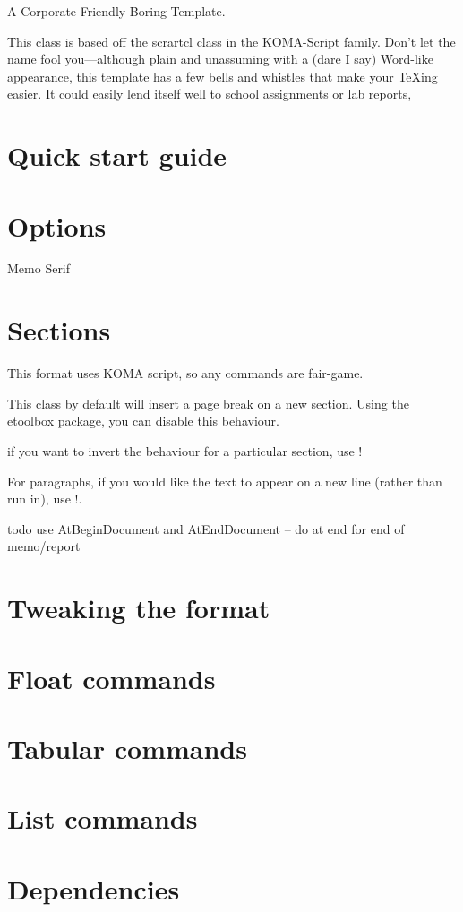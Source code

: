 \documentclass[memo]{corpboreport}
\begin{document}
A Corporate-Friendly Boring Template.

This class is based off the scrartcl class in the KOMA-Script family.
Don't let the name fool you---although plain and unassuming with a (dare I say) Word-like appearance,
this template has a few bells and whistles that make your TeXing easier.
It could easily lend itself well to school assignments or lab reports,

\section{Quick start guide}

\section{Options}
Memo
Serif

\section{Sections}

This format uses KOMA script, so any commands are fair-game.

This class by default will insert a page break on a new section.
Using the etoolbox package, you can disable this behaviour.

if you want to invert the behaviour for a particular section, use !

For paragraphs, if you would like the text to appear on a new line (rather than run in), use !.



todo use AtBeginDocument and AtEndDocument -- do at end for  end of memo/report

\section{Tweaking the format}

\section{Float commands}

\section{Tabular commands}

\section{List commands}

\section{Dependencies}

\PrintEndOfDocument*
\end{document}
